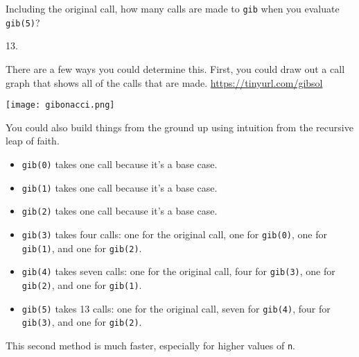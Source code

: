 \begin{blocksection}
\question Including the original call, how many calls are made to \lstinline{gib} when you evaluate \lstinline{gib(5)}?

\begin{solution}[2in]
13. 

There are a few ways you could determine this. First, you could draw out a call graph that shows all of the calls that are made. 
\url{https://tinyurl.com/gibsol}

\texttt{[image: gibonacci.png]}

You could also build things from the ground up using intuition from the recursive leap of faith. 
\begin{itemize}
    \item \lstinline{gib(0)} takes one call because it's a base case. 
    \item \lstinline{gib(1)} takes one call because it's a base case. 
    \item \lstinline{gib(2)} takes one call because it's a base case. 
    \item \lstinline{gib(3)} takes four calls: one for the original call, one for \lstinline{gib(0)}, one for \lstinline{gib(1)}, and one for \lstinline{gib(2)}. 
    \item \lstinline{gib(4)} takes seven calls: one for the original call, four for \lstinline{gib(3)}, one for \lstinline{gib(2)}, and one for \lstinline{gib(1)}. 
    \item \lstinline{gib(5)} takes 13 calls: one for the original call, seven for \lstinline{gib(4)}, four for \lstinline{gib(3)}, and one for \lstinline{gib(2)}. 
\end{itemize}
This second method is much faster, especially for higher values of \lstinline{n}. 
\end{solution}
\end{blocksection}

